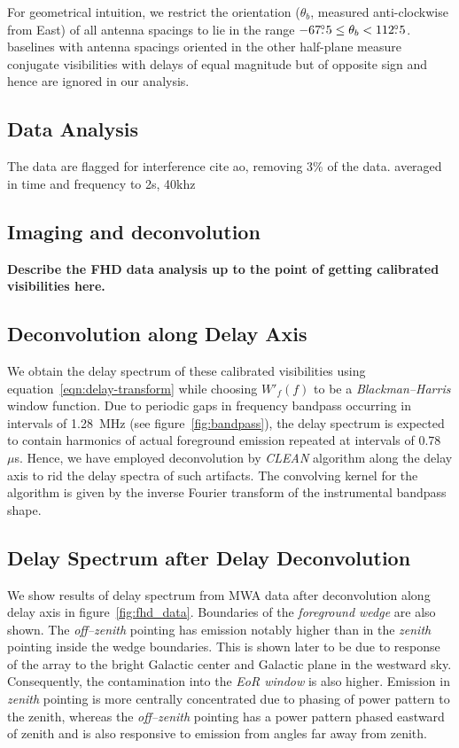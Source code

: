 \documentclass[preprint2,iop,numberedappendix]{emulateapj}
\begin{document}
For geometrical intuition, we restrict the orientation ($\theta_b$, measured anti-clockwise from East) of all antenna spacings to lie in the range $-67\mbox{$.\!\!^\circ$} 5 \leq \theta_b < 112\mbox{$.\!\!^\circ$} 5$. baselines with antenna spacings oriented in the other half-plane measure conjugate visibilities with delays of equal magnitude but of opposite sign and hence are ignored in our analysis.

\subsection{Data Analysis}\label{sec:data-analysis}
The data are flagged for interference cite ao, removing 3\% of the data.  averaged in time and frequency to 2s, 40khz



\subsection{Imaging and deconvolution}\label{sec:FHD}

{\bf Describe the FHD data analysis up to the point of getting calibrated visibilities here.}

\subsection{Deconvolution along Delay Axis}\label{sec:CLEAN}

We obtain the delay spectrum of these calibrated visibilities using equation~\ref{eqn:delay-transform} while choosing $W'_f(f)$ to be a {\it Blackman--Harris} window function. Due to periodic gaps in frequency bandpass occurring in intervals of 1.28~MHz (see figure~\ref{fig:bandpass}), the delay spectrum is expected to contain harmonics of actual foreground emission repeated at intervals of 0.78~$\mu$s. Hence, we have employed deconvolution by {\it CLEAN} algorithm \citep{tay99} along the delay axis \citep{par09,par12} to rid the delay spectra of such artifacts. The convolving kernel for the algorithm is given by the inverse Fourier transform of the instrumental bandpass shape. 

\subsection{Delay Spectrum after Delay Deconvolution}\label{sec:data-delay-spectrum}

We show results of delay spectrum from MWA data after deconvolution along delay axis in figure~\ref{fig:fhd_data}. Boundaries of the {\it foreground wedge} are also shown. The {\it off--zenith} pointing has emission notably higher than in the {\it zenith} pointing inside the wedge boundaries. This is shown later to be due to response of the array to the bright Galactic center and Galactic plane in the westward sky. Consequently, the contamination into the {\it EoR window} is also higher. Emission in {\it zenith} pointing is more centrally concentrated due to phasing of power pattern to the zenith, whereas the {\it off--zenith} pointing has a power pattern phased eastward of zenith and is also responsive to emission from angles far away from zenith. 
\end{document}
